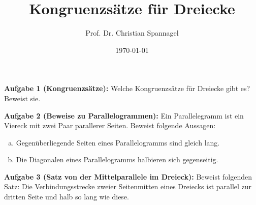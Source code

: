 \documentclass{../cssheet}
\title{Kongruenzsätze für Dreiecke}
\author{Prof. Dr. Christian Spannagel}
\date{\today}
\begin{document}
\printtitle

\textbf{Aufgabe 1 (Kongruenzsätze):}  Welche Kongruenzsätze für Dreiecke gibt es? Beweist sie.

\textbf{Aufgabe 2 (Beweise zu Parallelogrammen):}  Ein Parallelegramm ist ein Viereck mit zwei Paar parallerer Seiten. Beweist folgende Aussagen:
\begin{enumerate}[a)]
\item Gegenüberliegende Seiten eines Parallelogramms sind gleich lang.
\item Die Diagonalen eines Parallelogramms halbieren sich gegenseitig.
\end{enumerate}

\textbf{Aufgabe 3 (Satz von der Mittelparallele im Dreieck):}  Beweist folgenden Satz: Die Verbindungsstrecke zweier Seitenmitten eines Dreiecks ist parallel zur dritten Seite und halb so lang wie diese.

\vspace*{10mm}

\printlicense

\printsocials
\end{document}
